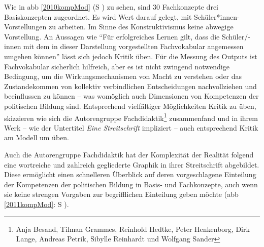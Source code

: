 Wie in \gls{abb} \ref{2010kompMod} (\gls{S} \pageref{2010kompMod}) zu sehen, sind 30 Fachkonzepte drei Basiskonzepten zugeordnet. Es wird Wert darauf gelegt, mit Schüler*innen-Vorstellungen zu arbeiten. Im Sinne des Konstruktivismus keine abwegige Vorstellung.
An Aussagen wie \enquote{Für erfolgreiches Lernen gilt, dass die Schüler/-innen mit dem in dieser Darstellung vorgestellten Fachvokabular angemessen umgehen können} \autocite[13]{weißeno.2010} lässt sich jedoch Kritik üben. Für die Messung des Outputs ist Fachvokabular sicherlich hilfreich, aber es ist nicht zwingend notwendige Bedingung, um die Wirkungsmechanismen von Macht zu verstehen oder das Zustandekommen von kollektiv verbindlichen Entscheidungen nachvollziehen und beeinflussen zu können -- was womöglich auch Dimensionen von Kompetenzen der politischen Bildung sind. Entsprechend vielfältiger Möglichkeiten Kritik zu üben, skizzieren \textcite[108-109]{Gloe2020} wie sich die Autorengruppe Fachdidaktik\footnote{
    Anja Besand, Tilman Grammes, Reinhold Hedtke, Peter Henkenborg, Dirk Lange, Andreas Petrik, Sibylle Reinhardt und Wolfgang Sander} 
zusammenfand und in ihrem Werk  -- wie der Untertitel \emph{Eine Streitschrift} impliziert -- auch entsprechend Kritik am Modell um \citeauthor{weißeno.2010} üben. 

Auch die Autorengruppe Fachdidaktik hat der Komplexität der Realität folgend eine wortreiche und zahlreich gegliederte Graphik in ihrer Streitschrift abgebildet. Diese ermöglicht einen schnelleren Überblick auf deren vorgeschlagene Einteilung der Kompetenzen der politischen Bildung in Basis- und Fachkonzepte, auch wenn sie keine strengen Vorgaben zur begrifflichen Einteilung geben möchte (\gls{abb} \ref{2011kompMod}: \gls{S} \pageref{2011kompMod}).

